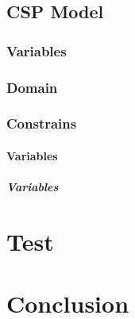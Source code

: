 \documentclass[a4paper]{article}
\theoremstyle{definition}
\theoremstyle{remark}
\begin{document}
\subsection{CSP Model}
\subsubsection{Variables}
\subsubsection{Domain}
\subsubsection{Constrains}

\paragraph{Variables}
\subparagraph{Variables}
\subsection{}
\section{Test}
\section{Conclusion}
\end{document}
